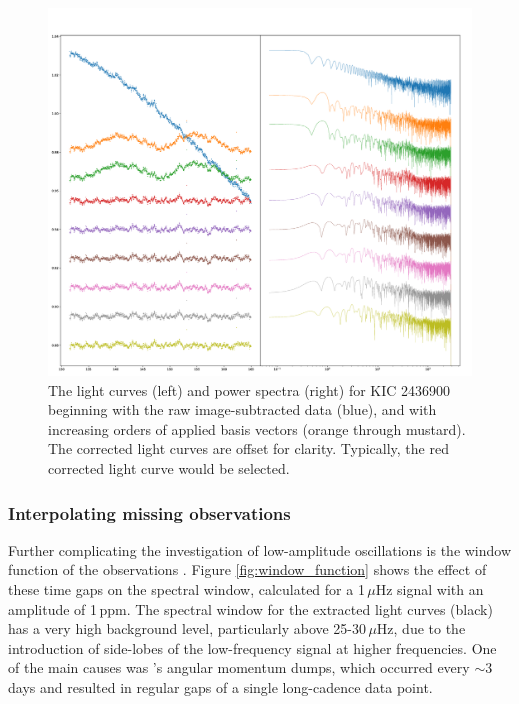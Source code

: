 \begin{figure}
    \centering
    \includegraphics[width=\linewidth]{Chapter5/KIC_2436900_detrending_CBVs_q01_rgs_lsq_mod2.png}
    \caption[Correction effect of applying an increasing number of RG-subset-derived CBVs to a typical RG light curve]{The light curves (left) and power spectra (right) for KIC 2436900 beginning with the raw image-subtracted data (blue), and with increasing orders of applied basis vectors (orange through mustard). The corrected light curves are offset for clarity. Typically, the red corrected light curve would be selected.}
    \label{fig:cbv_eg_q1}
\end{figure}

\subsubsection{Interpolating missing observations}
Further complicating the investigation of low-amplitude oscillations is the window function of the observations \citep{garcia_impact_2014}. Figure \ref{fig:window_function} shows the effect of these time gaps on the spectral window, calculated for a 1\,$\mu$Hz signal with an amplitude of 1\,ppm. The spectral window for the extracted light curves (black) has a very high background level, particularly above 25-30\,$\mu$Hz, due to the introduction of side-lobes of the low-frequency signal at higher frequencies. One of the main causes was \Kepler's angular momentum dumps, which occurred every $\sim3$\,days and resulted in regular gaps of a single long-cadence data point.

